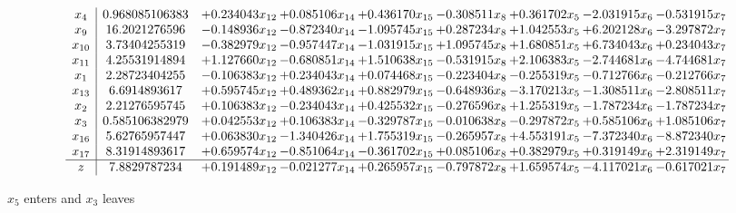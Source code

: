 \documentclass[10pt]{article}
\begin{document}
 \[\begin{array}{c| c c@{\hskip 2pt} c@{\hskip 2pt} c@{\hskip 2pt} c@{\hskip 2pt} c@{\hskip 2pt} c@{\hskip 2pt} c@{\hskip 2pt} }
 x_{4}   &  0.968085106383 & + 0.234043 x_{12} & + 0.085106 x_{14} & + 0.436170 x_{15} & -0.308511 x_{8} & + 0.361702 x_{5} & -2.031915 x_{6} & -0.531915 x_{7}\\
 x_{9}   &  16.2021276596 & -0.148936 x_{12} & -0.872340 x_{14} & -1.095745 x_{15} & + 0.287234 x_{8} & + 1.042553 x_{5} & + 6.202128 x_{6} & -3.297872 x_{7}\\
 x_{10}   &  3.73404255319 & -0.382979 x_{12} & -0.957447 x_{14} & -1.031915 x_{15} & + 1.095745 x_{8} & + 1.680851 x_{5} & + 6.734043 x_{6} & + 0.234043 x_{7}\\
 x_{11}   &  4.25531914894 & + 1.127660 x_{12} & -0.680851 x_{14} & + 1.510638 x_{15} & -0.531915 x_{8} & + 2.106383 x_{5} & -2.744681 x_{6} & -4.744681 x_{7}\\
 x_{1}   &  2.28723404255 & -0.106383 x_{12} & + 0.234043 x_{14} & + 0.074468 x_{15} & -0.223404 x_{8} & -0.255319 x_{5} & -0.712766 x_{6} & -0.212766 x_{7}\\
 x_{13}   &  6.6914893617 & + 0.595745 x_{12} & + 0.489362 x_{14} & + 0.882979 x_{15} & -0.648936 x_{8} & -3.170213 x_{5} & -1.308511 x_{6} & -2.808511 x_{7}\\
 x_{2}   &  2.21276595745 & + 0.106383 x_{12} & -0.234043 x_{14} & + 0.425532 x_{15} & -0.276596 x_{8} & + 1.255319 x_{5} & -1.787234 x_{6} & -1.787234 x_{7}\\
 x_{3}   &  0.585106382979 & + 0.042553 x_{12} & + 0.106383 x_{14} & -0.329787 x_{15} & -0.010638 x_{8} & -0.297872 x_{5} & + 0.585106 x_{6} & + 1.085106 x_{7}\\
 x_{16}   &  5.62765957447 & + 0.063830 x_{12} & -1.340426 x_{14} & + 1.755319 x_{15} & -0.265957 x_{8} & + 4.553191 x_{5} & -7.372340 x_{6} & -8.872340 x_{7}\\
 x_{17}   &  8.31914893617 & + 0.659574 x_{12} & -0.851064 x_{14} & -0.361702 x_{15} & + 0.085106 x_{8} & + 0.382979 x_{5} & + 0.319149 x_{6} & + 2.319149 x_{7}\\
\hline
z    &  7.8829787234 & + 0.191489 x_{12} & -0.021277 x_{14} & + 0.265957 x_{15} & -0.797872 x_{8} & + 1.659574 x_{5} & -4.117021 x_{6} & -0.617021 x_{7}\\
\end{array}\]


 $ x_{5} $ enters and $ x_{3} $ leaves 
\end{document}
